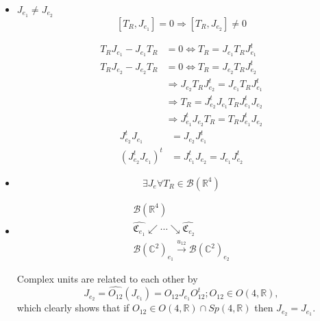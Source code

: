 \documentclass[aps,preprint]{revtex4}%
\begin{document}
\begin{itemize}
\item $J_{e_{1}}\neq J_{e_{2}}$
\begin{equation}
\left[  T_{R},J_{e_{1}}\right]  =0\Rightarrow\left[  T_{R},J_{e_{2}}\right]
\neq0
\end{equation}
%

\begin{align}
T_{R}J_{e_{1}}-J_{e_{1}}T_{R}  &  =0\Leftrightarrow T_{R}=J_{e_{1}}%
T_{R}J_{e_{1}}^{t}\\
T_{R}J_{e_{2}}-J_{e_{2}}T_{R}  &  =0\Leftrightarrow T_{R}=J_{e_{2}}%
T_{R}J_{e_{2}}^{t}\\
&  \Rightarrow J_{e_{2}}T_{R}J_{e_{2}}^{t}=J_{e_{1}}T_{R}J_{e_{1}}^{t}\\
&  \Rightarrow T_{R}=J_{e_{2}}^{t}J_{e_{1}}T_{R}J_{e_{1}}^{t}J_{e_{2}}\\
&  \Rightarrow J_{e_{1}}^{t}J_{e_{2}}T_{R}=T_{R}J_{e_{1}}^{t}J_{e_{2}}%
\end{align}%
\begin{align}
J_{e_{2}}^{t}J_{e_{1}}  &  =J_{e_{2}}J_{e_{1}}^{t}\\
\left(  J_{e_{2}}^{t}J_{e_{1}}\right)  ^{t}  &  =J_{e_{1}}^{t}J_{e_{2}%
}=J_{e_{1}}J_{e_{2}}^{t}%
\end{align}


\item
\begin{equation}
\exists J_{e}\forall T_{R}\in\mathcal{B}\left(  \mathbb{R}^{4}\right)
\end{equation}


\item
\begin{gather}
\mathcal{B}\left(  \mathbb{R}^{4}\right) \\
\widehat{\mathfrak{C}_{e_{1}}}\swarrow\cdots\searrow\widehat{\mathfrak{C}%
_{e_{2}}}\\
\mathcal{B}\left(  \mathbb{C}^{2}\right)  _{e_{1}}\overset{u_{12}%
}{\longrightarrow}\mathcal{B}\left(  \mathbb{C}^{2}\right)  _{e_{2}}%
\end{gather}


Complex units are related to each other by
\begin{equation}
J_{e_{2}}=\widehat{O_{12}}\left(  J_{e_{1}}\right)  =O_{12}J_{e_{1}}O_{12}%
^{t};O_{12}\in O\left(  4,\mathbb{R}\right)  ,
\end{equation}
which clearly shows that if $O_{12}\in O\left(  4,\mathbb{R}\right)  \cap
Sp\left(  4,\mathbb{R}\right)  $ then $J_{e_{2}}=J_{e_{1}}.$
\end{itemize}
\end{document}
